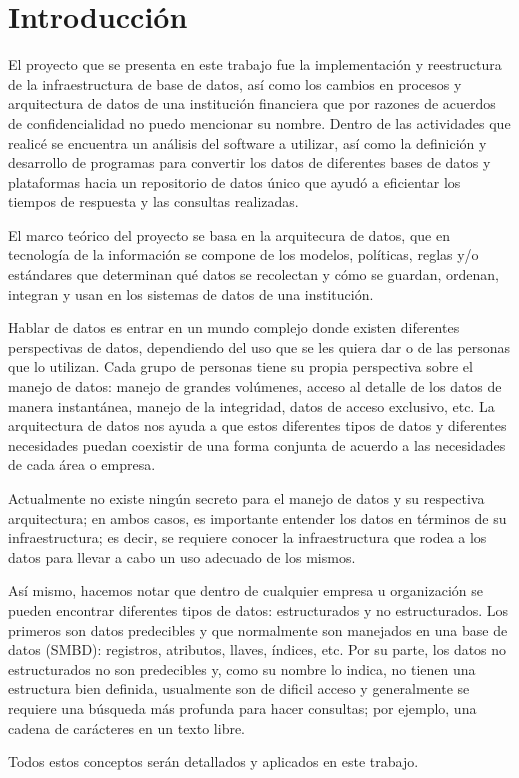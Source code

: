 \chapter{Introducción}
\label{cap:introduccion}

El proyecto que se presenta en este trabajo fue la implementación y reestructura
de la infraestructura de base de datos, así como los cambios en procesos y
arquitectura de datos de una institución financiera que por razones de acuerdos
de confidencialidad no puedo mencionar su nombre. Dentro de las actividades que
realicé se encuentra un análisis del software a utilizar, así como la definición
y desarrollo de programas para convertir los datos de diferentes bases de datos
y plataformas hacia un repositorio de datos único que ayudó a eficientar los
tiempos de respuesta y las consultas realizadas.

El marco teórico del proyecto se basa en la arquitecura de datos, que en
tecnología de la información se compone de los modelos, políticas, reglas y/o
estándares que determinan qué datos se recolectan y cómo se guardan, ordenan,
integran y usan en los sistemas de datos de una institución.

Hablar de datos es entrar en un mundo complejo donde existen diferentes
perspectivas de datos, dependiendo del uso que se les quiera dar o de las
personas que lo utilizan. Cada grupo de personas tiene su propia perspectiva
sobre el manejo de datos: manejo de grandes volúmenes, acceso al detalle de los
datos de manera instantánea, manejo de la integridad, datos de acceso exclusivo,
etc. La arquitectura de datos nos ayuda a que estos diferentes tipos de datos y
diferentes necesidades puedan coexistir de una forma conjunta de acuerdo a las
necesidades de cada área o empresa.

Actualmente no existe ningún secreto para el manejo de datos y su respectiva
arquitectura; en ambos casos, es importante entender los datos en términos de su
infraestructura; es decir, se requiere conocer la infraestructura que rodea a
los datos para llevar a cabo un uso adecuado de los mismos.

Así mismo, hacemos notar que dentro de cualquier empresa u organización se
pueden encontrar diferentes tipos de datos: estructurados y no
estructurados. Los primeros son datos predecibles y que normalmente son
manejados en una base de datos (SMBD): registros, atributos, llaves, índices,
etc. Por su parte, los datos no estructurados no son predecibles y, como su
nombre lo indica, no tienen una estructura bien definida, usualmente son de
dificil acceso y generalmente se requiere una búsqueda más profunda para hacer
consultas; por ejemplo, una cadena de carácteres en un texto libre.

Todos estos conceptos serán detallados y aplicados en este trabajo.

\cleardoublepage

